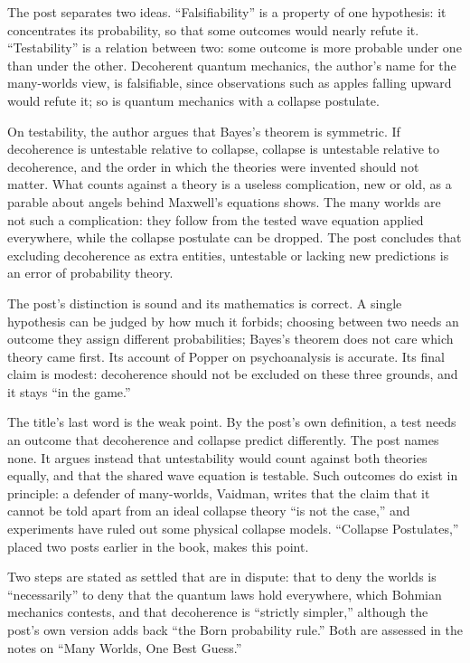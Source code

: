 \begin{afterword}
\summaryhead

The post separates two ideas. ``Falsifiability'' is a property of one hypothesis: it concentrates its probability, so that some outcomes would nearly refute it. ``Testability'' is a relation between two: some outcome is more probable under one than under the other. Decoherent quantum mechanics, the author's name for the many-worlds view, is falsifiable, since observations such as apples falling upward would refute it; so is quantum mechanics with a collapse postulate.

On testability, the author argues that Bayes's theorem is symmetric. If decoherence is untestable relative to collapse, collapse is untestable relative to decoherence, and the order in which the theories were invented should not matter. What counts against a theory is a useless complication, new or old, as a parable about angels behind Maxwell's equations shows. The many worlds are not such a complication: they follow from the tested wave equation applied everywhere, while the collapse postulate can be dropped. The post concludes that excluding decoherence as extra entities, untestable or lacking new predictions is an error of probability theory.

\responsehead

The post's distinction is sound and its mathematics is correct. A single hypothesis can be judged by how much it forbids; choosing between two needs an outcome they assign different probabilities; Bayes's theorem does not care which theory came first. Its account of Popper on psychoanalysis is accurate. Its final claim is modest: decoherence should not be excluded on these three grounds, and it stays ``in the game.''

The title's last word is the weak point. By the post's own definition, a test needs an outcome that decoherence and collapse predict differently. The post names none. It argues instead that untestability would count against both theories equally, and that the shared wave equation is testable. Such outcomes do exist in principle: a defender of many-worlds, Vaidman, writes that the claim that it cannot be told apart from an ideal collapse theory ``is not the case,'' and experiments have ruled out some physical collapse models. ``Collapse Postulates,'' placed two posts earlier in the book, makes this point.

Two steps are stated as settled that are in dispute: that to deny the worlds is ``necessarily'' to deny that the quantum laws hold everywhere, which Bohmian mechanics contests, and that decoherence is ``strictly simpler,'' although the post's own version adds back ``the Born probability rule.'' Both are assessed in the notes on ``Many Worlds, One Best Guess.''


\end{afterword}
